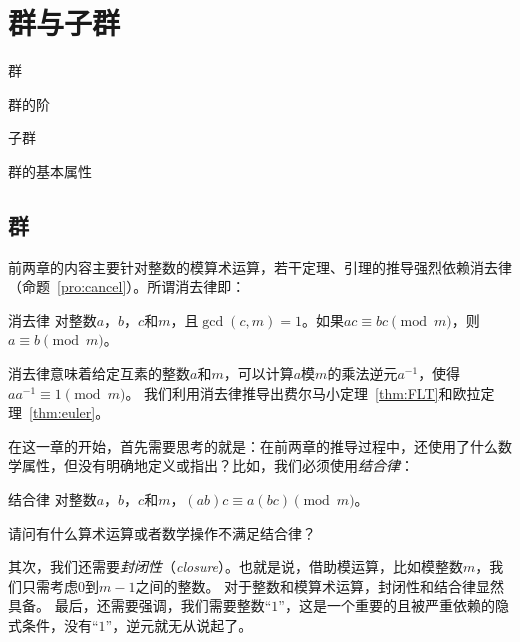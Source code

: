 
\chapter{群与子群}
\label{chap:group} 

\begin{introduction}
  \item 群
  \item 群的阶
  \item 子群
  \item 群的基本属性
\end{introduction}

\section{群} 
\label{sec:group}
前两章的内容主要针对整数的模算术运算，若干定理、引理的推导强烈依赖消去律（命题~\ref{pro:cancel}）。所谓消去律即：
\begin{theorem*}{消去律}{}
对整数$a$，$b$，$c$和$m$，且$\gcd(c, m) = 1$。如果$ac \equiv bc \pmod{m}$，则$a \equiv b \pmod{m}$。
\end{theorem*}

消去律意味着给定互素的整数$a$和$m$，可以计算$a$模$m$的乘法逆元$a^{-1}$，使得$a a^{-1} \equiv 1 \pmod{m}$。
我们利用消去律推导出费尔马小定理~\ref{thm:FLT}和欧拉定理~\ref{thm:euler}。
	
在这一章的开始，首先需要思考的就是：在前两章的推导过程中，还使用了什么数学属性，但没有明确地定义或指出？比如，我们必须使用\emph{结合律}： 

\begin{theorem*}{结合律}{}
对整数$a$，$b$，$c$和$m$，$(ab)c \equiv a(bc) \pmod{m}$。
\end{theorem*}

\begin{thinking} 
请问有什么算术运算或者数学操作不满足结合律？
\end{thinking}

其次，我们还需要\emph{封闭性}（\emph{closure}）。也就是说，借助模运算，比如模整数$m$，我们只需考虑$0$到$m-1$之间的整数。
对于整数和模算术运算，封闭性和结合律显然具备。
最后，还需要强调，我们需要整数“$1$”，这是一个重要的且被严重依赖的隐式条件，没有“$1$”，逆元就无从说起了。

